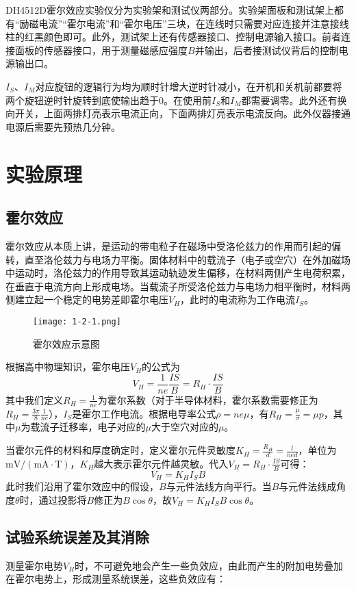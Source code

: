 \documentclass[12pt]{article}
\begin{document}
DH4512D霍尔效应实验仪分为实验架和测试仪两部分。实验架面板和测试架上都有“励磁电流”“霍尔电流”和“霍尔电压”三块，在连线时只需要对应连接并注意接线柱的红黑颜色即可。此外，测试架上还有传感器接口、控制电源输入接口。前者连接面板的传感器接口，用于测量磁感应强度$B$并输出，后者接测试仪背后的控制电源输出口。

$I_S$、$I_M$对应旋钮的逻辑行为均为顺时针增大逆时针减小，在开机和关机前都要将两个旋钮逆时针旋转到底使输出趋于0。在使用前$I_S$和$I_M$都需要调零。此外还有换向开关，上面两排灯亮表示电流正向，下面两排灯亮表示电流反向。此外仪器接通电源后需要先预热几分钟。

\section{实验原理}
\subsection{霍尔效应}
霍尔效应从本质上讲，是运动的带电粒子在磁场中受洛伦兹力的作用而引起的偏转，直至洛伦兹力与电场力平衡。固体材料中的载流子（电子或空穴）在外加磁场中运动时，洛伦兹力的作用导致其运动轨迹发生偏移，在材料两侧产生电荷积累，在垂直于电流方向上形成电场。当载流子所受洛伦兹力与电场力相平衡时，材料两侧建立起一个稳定的电势差即霍尔电压$V_H$，此时的电流称为工作电流$I_S$。

\newpage

\begin{figure}[htbp]
    \centering
    \texttt{[image: 1-2-1.png]}
    \caption{霍尔效应示意图}
\end{figure}

根据高中物理知识，霍尔电压$V_H$的公式为
\[
    V_H=\frac{1}{ne}\frac{IS}{B}=R_H\cdot\frac{IS}{B}
\]
其中我们定义$R_H=\frac{1}{ne}$为霍尔系数（对于半导体材料，霍尔系数需要修正为$R_H=\frac{3\pi}{8}\frac{1}{ne}$），$I_S$是霍尔工作电流。根据电导率公式$\rho=ne\mu$，有$R_H=\frac{\mu}{\sigma}=\mu p$，其中$\mu$为载流子迁移率，电子对应的$\mu$大于空穴对应的$\mu$。

当霍尔元件的材料和厚度确定时，定义霍尔元件灵敏度$K_H=\frac{R_H}{d}=\frac{l}{ned}$，单位为$\mathrm{mV/(mA\cdot T)}$，$K_H$越大表示霍尔元件越灵敏。代入$V_H=R_H\cdot\frac{IS}{B}$可得：
\[
    V_H=K_HI_SB
\]
此时我们沿用了霍尔效应中的假设，$B$与元件法线方向平行。当$B$与元件法线成角度$\theta$时，通过投影将$B$修正为$B\cos\theta$，故$V_H=K_HI_SB\cos\theta$。

\subsection{试验系统误差及其消除}
测量霍尔电势$V_H$时，不可避免地会产生一些负效应，由此而产生的附加电势叠加在霍尔电势上，形成测量系统误差，这些负效应有：
\end{document}
